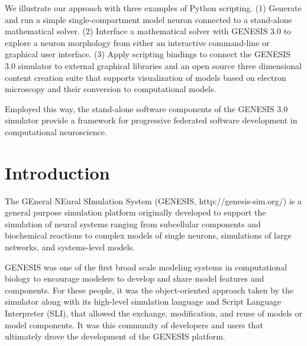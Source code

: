 \documentclass[10pt]{article}
\begin{document}
We illustrate our approach with three examples of Python scripting. 
(1) Generate and run a simple single-compartment model neuron connected to a 
stand-alone mathematical solver. (2) Interface a mathematical solver with GENESIS 3.0 to explore a neuron morphology from either
an interactive command-line or graphical user interface.
(3) Apply scripting bindings to connect the GENESIS 3.0 simulator to
external graphical libraries and an open source three dimensional content creation
suite that supports visualization of models based on electron
microscopy and their conversion to computational
models.

Employed this way, the stand-alone software components of the GENESIS 3.0 
simulator provide a framework for progressive federated
software development in computational neuroscience.\\


\section*{Introduction}

The GEneral NEural SImulation System (GENESIS,
http://genesis-sim.org/) is a general purpose simulation platform originally
developed to support the simulation of neural systems ranging from
subcellular components and biochemical reactions to complex models of
single neurons, simulations of large networks, and systems-level
models.

GENESIS was one of the first broad scale modeling systems in
computational biology to encourage modelers to develop and share model
features and components. For these people, it was the object-oriented
approach taken by the simulator along with its high-level simulation
language and Script Language Interpreter (SLI), that allowed the exchange, modification, and reuse of models
or model components.  It was this community of developers and
 users that ultimately drove the development of the GENESIS platform.
 
\end{document}
